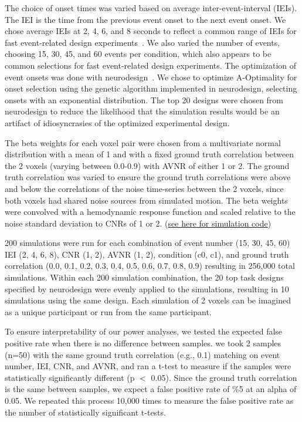 \documentclass[phd,figures,tables,ackpage,abstractpage,publicabstractpage]{uithesis}
\begin{document}
The choice of onset times was varied based on average inter-event-interval (IEIs).
The IEI is the time from the previous event onset to the next event onset.
We chose average IEIs at 2, 4, 6, and 8 seconds to reflect a common range of IEIs
for fast event-related design experiments~\cite{Hennigan2015,Dichter2007,Goghari2009}.
We also varied the number of events, choosing 15, 30, 45, and 60 events per condition,
which also appears to be common selections for fast event-related design experiments.
The optimization of event onsets was done with neurodesign~\cite{Durnez2018}.
We chose to optimize A-Optimality for onset selection using the genetic algorithm implemented
in neurodesign, selecting onsets with an exponential distribution.
The top 20 designs were chosen from neurodesign to reduce the likelihood
that the simulation results would be an artifact of idiosyncrasies
of the optimized experimental design.

The beta weights for each voxel pair were chosen from a multivariate normal distribution
with a mean of 1 and with a fixed ground truth correlation between the 2 voxels 
(varying between 0.0-0.9) with AVNR of either 1 or 2.
The ground truth correlation was varied to ensure the ground truth correlations were above
and below the correlations of the noise time-series between the 2 voxels,
since both voxels had shared noise sources from simulated motion.
The beta weights were convolved with a hemodynamic response function and scaled
relative to the noise standard deviation to CNRs of 1 or 2.
(\href{https://github.com/jdkent/betaSeriesSimulations/tree/34bf1ff5b05c0eeae855f0e8e1267765bf14999a/beta_sim}{see here for simulation code})

200 simulations were run for each combination of event number
(15, 30, 45, 60) IEI (2, 4, 6, 8),  CNR (1, 2), AVNR (1, 2), condition (c0, c1),
and ground truth correlation
(0.0, 0.1, 0.2, 0.3, 0.4, 0.5, 0.6, 0.7, 0.8, 0.9)
resulting in 256,000 total simulations.
Within each 200 simulation combination, the 20 top task designs specified by
neurodesign were evenly applied to the simulations, resulting in 10 simulations
using the same design.
Each simulation of 2 voxels can be imagined as a unique participant or run from
the same participant.

To ensure interpretability of our power analyses, we tested
the expected false positive rate when there is no difference between samples.
we took 2 samples (n=50) with the same ground truth correlation (e.g., 0.1)
matching on event number, IEI, CNR, and AVNR, and ran a t-test to measure if the samples
were statistically significantly different (p $<$ 0.05).
Since the ground truth correlation is the same between samples,
we expect a false positive rate of \%5 at an alpha of 0.05.
We repeated this process 10,000 times to measure the false positive rate as
the number of statistically significant t-tests.
\end{document}
